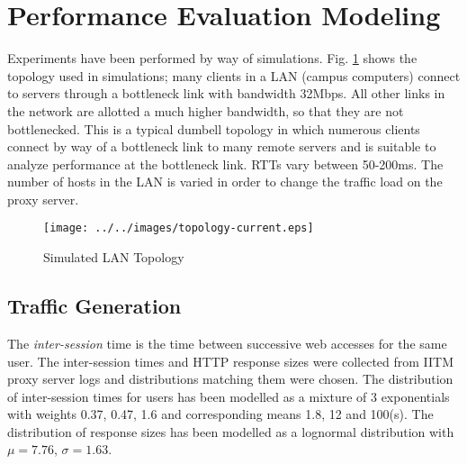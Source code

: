 \documentclass[conference]{../../IEEEtran}
\begin{document}
\section{Performance Evaluation Modeling}
\label{sec:setup}

Experiments have been performed by way of simulations. Fig. \ref{fig:lantopology} shows the topology used in simulations; many clients in a LAN (campus computers) connect to servers through a bottleneck link with bandwidth 32Mbps. All other links in the network are allotted a much higher bandwidth, so that they are not bottlenecked. This is a typical dumbell topology in which numerous clients connect by way of a bottleneck link to many remote servers and is suitable to analyze performance at the bottleneck link. RTTs vary between 50-200ms. The number of hosts in the LAN is varied in order to change the traffic load on the proxy server.


\begin{figure}[hbt]
\centering
  \texttt{[image: ../../images/topology-current.eps]}
 \caption{Simulated LAN Topology}
 \label{fig:lantopology}
\end{figure}



\subsection{Traffic Generation}

The \emph{inter-session} time is the time between successive web accesses for the same user. The inter-session times and HTTP response sizes were collected from IITM proxy server logs and distributions matching them were chosen.  The distribution of inter-session times for users has been modelled as a mixture of 3 exponentials with weights 0.37, 0.47, 1.6 and corresponding means 1.8, 12 and 100(s). The distribution of response sizes has been modelled as a lognormal distribution with $\mu = 7.76$, $\sigma = 1.63$. 
	
\end{document}
